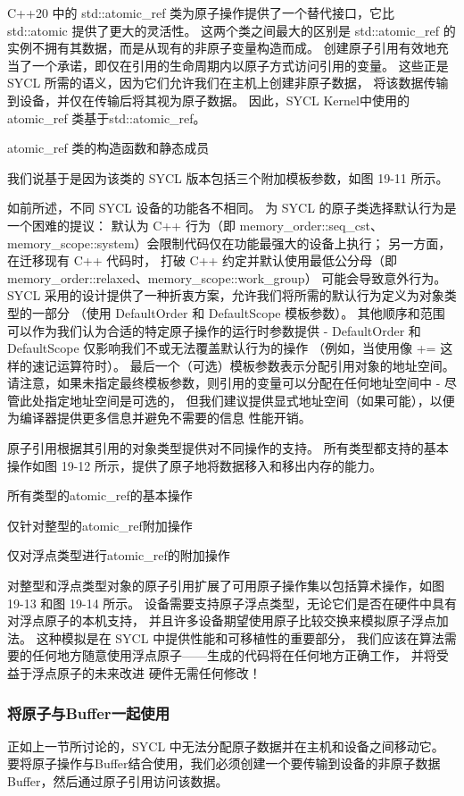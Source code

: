 C++20 中的 std::atomic\_ref 类为原子操作提供了一个替代接口，它比 std::atomic 提供了更大的灵活性。 
这两个类之间最大的区别是 std::atomic\_ref 的实例不拥有其数据，而是从现有的非原子变量构造而成。 
创建原子引用有效地充当了一个承诺，即仅在引用的生命周期内以原子方式访问引用的变量。 
这些正是 SYCL 所需的语义，因为它们允许我们在主机上创建非原子数据，
将该数据传输到设备，并仅在传输后将其视为原子数据。 
因此，SYCL Kernel中使用的atomic\_ref 类基于std::atomic\_ref。

{\color{red} atomic\_ref 类的构造函数和静态成员}

我们说基于是因为该类的 SYCL 版本包括三个附加模板参数，如图 19-11 所示。

如前所述，不同 SYCL 设备的功能各不相同。 
为 SYCL 的原子类选择默认行为是一个困难的提议：
默认为 C++ 行为（即 memory\_order::seq\_cst、memory\_scope::system）会限制代码仅在功能最强大的设备上执行； 
另一方面，在迁移现有 C++ 代码时，
打破 C++ 约定并默认使用最低公分母（即 memory\_order::relaxed、memory\_scope::work\_group）
可能会导致意外行为。 
SYCL 采用的设计提供了一种折衷方案，允许我们将所需的默认行为定义为对象类型的一部分
（使用 DefaultOrder 和 DefaultScope 模板参数）。 
其他顺序和范围可以作为我们认为合适的特定原子操作的运行时参数提供
 - DefaultOrder 和 DefaultScope 仅影响我们不或无法覆盖默认行为的操作
 （例如，当使用像 += 这样的速记运算符时）。 最后一个（可选）模板参数表示分配引用对象的地址空间。 
 请注意，如果未指定最终模板参数，则引用的变量可以分配在任何地址空间中 - 尽管此处指定地址空间是可选的，
 但我们建议提供显式地址空间（如果可能），以便为编译器提供更多信息并避免不需要的信息 性能开销。

原子引用根据其引用的对象类型提供对不同操作的支持。 
所有类型都支持的基本操作如图 19-12 所示，提供了原子地将数据移入和移出内存的能力。

{\color{red} 所有类型的atomic\_ref的基本操作}

{\color{red} 仅针对整型的atomic\_ref附加操作}

{\color{red} 仅对浮点类型进行atomic\_ref的附加操作}

对整型和浮点类型对象的原子引用扩展了可用原子操作集以包括算术操作，如图 19-13 和图 19-14 所示。 
设备需要支持原子浮点类型，无论它们是否在硬件中具有对浮点原子的本机支持，
并且许多设备期望使用原子比较交换来模拟原子浮点加法。 
这种模拟是在 SYCL 中提供性能和可移植性的重要部分，
我们应该在算法需要的任何地方随意使用浮点原子——生成的代码将在任何地方正确工作，
并将受益于浮点原子的未来改进 硬件无需任何修改！

\subsubsection{将原子与Buffer一起使用}
正如上一节所讨论的，SYCL 中无法分配原子数据并在主机和设备之间移动它。 
要将原子操作与Buffer结合使用，我们必须创建一个要传输到设备的非原子数据Buffer，然后通过原子引用访问该数据。

